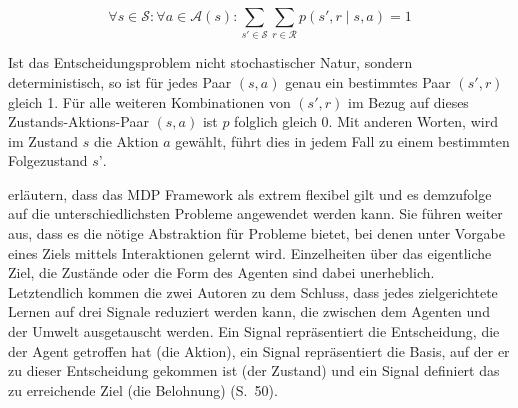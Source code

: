 \begin{equation}\label{eq:wahrscheinlichkeitsverteilung}
    \forall s \in \mathcal{S}: \forall a \in \mathcal{A}(s):
\sum_{s' \in \mathcal{S}} \sum_{r \in \mathcal{R}} p(s', r \mid s,a) = 1 
\end{equation}

Ist das Entscheidungsproblem nicht stochastischer Natur, sondern deterministisch, so ist für jedes Paar $(s,a)$ genau ein bestimmtes Paar $(s',r)$ gleich 1. Für alle weiteren Kombinationen von $(s',r)$ im Bezug auf dieses Zustands-Aktions-Paar $(s,a)$ ist $p$ folglich gleich 0. Mit anderen Worten, wird im Zustand $s$ die Aktion $a$ gewählt, führt dies in jedem Fall zu einem bestimmten Folgezustand $s’$. 
\par 

\cite{Sutton1998} erläutern, dass das MDP Framework als extrem flexibel gilt und es demzufolge auf die unterschiedlichsten Probleme angewendet werden kann. Sie führen weiter aus, dass es die nötige Abstraktion für Probleme bietet, bei denen unter Vorgabe eines Ziels mittels Interaktionen gelernt wird. Einzelheiten über das eigentliche Ziel, die Zustände oder die Form des Agenten sind dabei unerheblich. 
Letztendlich kommen die zwei Autoren zu dem Schluss, dass \glqq jedes zielgerichtete Lernen auf drei Signale reduziert werden kann, die zwischen dem Agenten und der Umwelt ausgetauscht werden. Ein Signal repräsentiert die Entscheidung, die der Agent getroffen hat (die Aktion), ein Signal repräsentiert die Basis, auf der er zu dieser Entscheidung gekommen ist (der Zustand) und ein Signal definiert das zu erreichende Ziel (die Belohnung)\grqq{} (S.~50).

